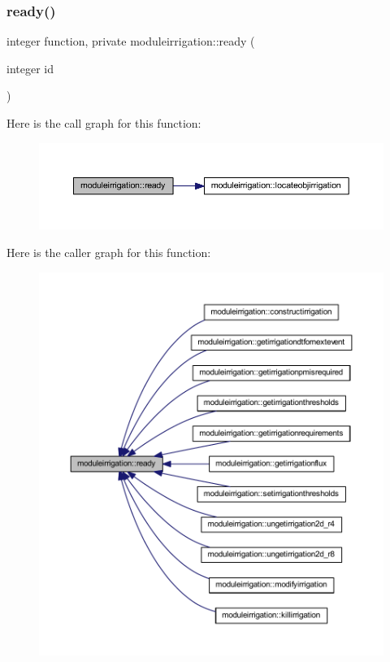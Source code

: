 \subsubsection{\texorpdfstring{ready()}{ready()}}
{\footnotesize\ttfamily integer function, private moduleirrigation\+::ready (\begin{DoxyParamCaption}\item[{integer}]{id }\end{DoxyParamCaption})\hspace{0.3cm}{\ttfamily [private]}}

Here is the call graph for this function\+:\nopagebreak
\begin{figure}[H]
\begin{center}
\leavevmode
\includegraphics[width=350pt]{namespacemoduleirrigation_afbdbea5850d2436e5bbe8f9fb8da65bd_cgraph}
\end{center}
\end{figure}
Here is the caller graph for this function\+:\nopagebreak
\begin{figure}[H]
\begin{center}
\leavevmode
\includegraphics[width=350pt]{namespacemoduleirrigation_afbdbea5850d2436e5bbe8f9fb8da65bd_icgraph}
\end{center}
\end{figure}
\mbox{\label{namespacemoduleirrigation_ac485f39127c7b84771cf5b8e2a64e5d7}} 
